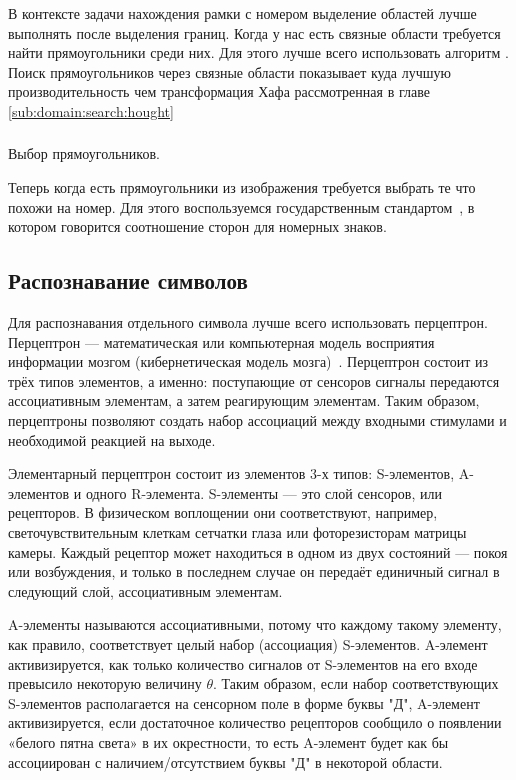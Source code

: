 В контексте задачи нахождения рамки с номером выделение областей лучше выполнять после выделения границ. Когда у нас есть связные области требуется найти прямоугольники среди них. Для этого лучше всего использовать алгоритм \minAreaRect{}. Поиск прямоугольников через связные области показывает куда лучшую производительность чем трансформация Хафа рассмотренная в главе \ref{sub:domain:search:hought}

\subsubsection{}
\label{sub:domain:search:selectrect}
Выбор прямоугольников.

Теперь когда есть прямоугольники из изображения требуется выбрать те что похожи на номер. Для этого воспользуемся государственным стандартом~\cite{stb_914_99}, в котором говорится соотношение сторон для номерных знаков.

\subsection{Распознавание символов}
\label{sub:domain:imagerecognition}
Для распознавания отдельного символа лучше всего использовать перцептрон.
Перцептрон — математическая или компьютерная модель восприятия информации мозгом (кибернетическая модель мозга)~\cite{perceptron}.
Перцептрон состоит из трёх типов элементов, а именно: поступающие от сенсоров сигналы передаются ассоциативным элементам, а затем реагирующим элементам. Таким образом, перцептроны позволяют создать набор ассоциаций между входными стимулами и необходимой реакцией на выходе.

Элементарный перцептрон состоит из элементов 3-х типов: S-элементов, A-элементов и одного R-элемента. S-элементы — это слой сенсоров, или рецепторов. В физическом воплощении они соответствуют, например, светочувствительным клеткам сетчатки глаза или фоторезисторам матрицы камеры. Каждый рецептор может находиться в одном из двух состояний — покоя или возбуждения, и только в последнем случае он передаёт единичный сигнал в следующий слой, ассоциативным элементам.

A-элементы называются ассоциативными, потому что каждому такому элементу, как правило, соответствует целый набор (ассоциация) S-элементов. A-элемент активизируется, как только количество сигналов от S-элементов на его входе превысило некоторую величину $\theta$. Таким образом, если набор соответствующих S-элементов располагается на сенсорном поле в форме буквы "Д", A-элемент активизируется, если достаточное количество рецепторов сообщило о появлении «белого пятна света» в их окрестности, то есть A-элемент будет как бы ассоциирован с наличием/отсутствием буквы "Д" в некоторой области.

